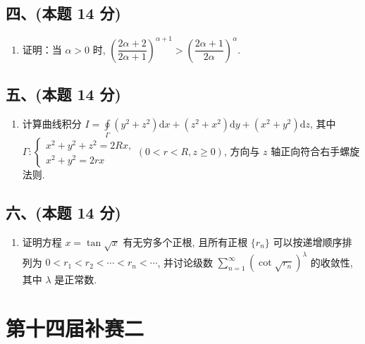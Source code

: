 \subsection*{四、(本题 14 分)}
\begin{enumerate}[start=8]
    \item 证明：当 $\alpha > 0$ 时, $\left(\dfrac{2\alpha + 2}{2\alpha + 1}\right)^{\alpha+1} > \left(\dfrac{2\alpha + 1}{2\alpha}\right)^{\alpha}$.
\end{enumerate}

\subsection*{五、(本题 14 分)}
\begin{enumerate}[start=9]
    \item 计算曲线积分 $I = \displaystyle\oint\limits_{\Gamma}(y^2 + z^2)\mathrm{d}x + (z^2 + x^2)\mathrm{d}y + (x^2 + y^2)\mathrm{d}z$, 其中 $\Gamma : \begin{cases}
                  x^2 + y^2 + z^2 = 2Rx, \\
                  x^2 + y^2 = 2rx
              \end{cases} (0 < r < R,  z \geq 0)$, 方向与 $z$ 轴正向符合右手螺旋法则.
\end{enumerate}

\subsection*{六、(本题 14 分)}
\begin{enumerate}[start=10]
    \item 证明方程 $x = \tan\sqrt{x}$ 有无穷多个正根, 且所有正根 $\{r_n\}$ 可以按递增顺序排列为 $0 < r_1 < r_2 < \cdots < r_n < \cdots$, 并讨论级数 $\displaystyle\sum_{n=1}^{\infty}(\cot\sqrt{r_n})^\lambda$ 的收敛性, 其中 $\lambda$ 是正常数.
\end{enumerate}


\newpage
\section{第十四届补赛二}

